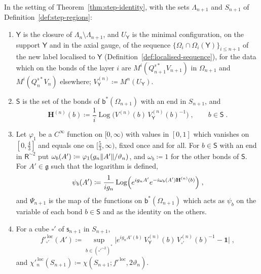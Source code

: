 \documentclass[11pt]{preprint}
\newcommand{\id}{\mathbf 1}
\DeclarePairedDelimiter{\norm}{\lVert}{\rVert}
\numberwithin{equation}{section}
\begin{document}
\begin{definition}\label{def:boundary-field}
In the setting of Theorem~\ref{thm:step-identity}, with the sets $\Lambda_{n+1}$ and $S_{n+1}$ of Definition~\ref{def:step-regions}:
\begin{enumerate}[label=(\roman*)]
\item $\mathsf Y$ is the closure of $\Lambda_n \setminus \Lambda_{n+1}$, and $U_{\mathsf Y}$ is the minimal configuration, on the support $\mathsf Y$ and in the axial gauge, of the sequence $\{ \Omega_i \cap \Omega_i(\mathsf Y) \}_{i \leqslant n+1}$ of the new label localised to $\mathsf Y$ (Definition~\ref{def:localised-sequence}), for the data which on the bonds of the layer $i$ are $M^i(Q^{s*}_{n+1}V_{n+1})$ in $\Omega_{n+1}$ and $M^i(Q^{s*}_nV_n)$ elsewhere; $V^{(n)}_{\mathsf Y} \coloneqq M^n(U_{\mathsf Y})$.
\item $\mathsf S$ is the set of the bonds of $\mathsf b^*(\Omega_{n+1})$ with an end in $S_{n+1}$, and
\begin{equation}\label{eq:boundary-field}
    \mathbf H^{(n)}(b) \coloneqq \frac{1}{i}\operatorname{Log}\bigl(V^{(n)}(b)\,V^{(n)}_{\mathsf Y}(b)^{-1}\bigr)\;,
    \qquad
    b \in \mathsf S\;.
\end{equation}
\item Let $\varphi_1$ be a $C^\infty$ function on $[0, \infty)$ with values in $[0, 1]$ which vanishes on $[0, \frac{4}{3}]$ and equals one on $[\frac{5}{3}, \infty)$, fixed once and for all. For $b \in \mathsf S$ with an end in $\mathsf R^{\sim2}$ put $\omega_b(A') \coloneqq \varphi_1(g_n\norm{A'}/\vartheta_n)$, and $\omega_b \coloneqq 1$ for the other bonds of $\mathsf S$. For $A' \in \mathfrak g$ such that the logarithm is defined,
\begin{equation}\label{eq:boundary-change}
    \psi_b(A') \coloneqq \frac{1}{ig_n}\operatorname{Log}\Bigl(e^{ig_nA'}e^{-i\omega_b(A')\mathbf H^{(n)}(b)}\Bigr)\;,
\end{equation}
and $\Psi_{n+1}$ is the map of the functions on $\mathsf b^*(\Omega_{n+1})$ which acts as $\psi_b$ on the variable of each bond $b \in \mathsf S$ and as the identity on the others.
\item For a cube $\square'$ of $\mathsf s_{n+1}$ in $S_{n+1}$,
\begin{equation}\label{eq:local-deviation-test}
    f'^{\,\mathrm{loc}}_{\square'}(A') \coloneqq \sup_{b \in (\square'^{\sim2})^*}\bigl\lvert e^{ig_nA'(b)}\,V^{(n)}_{\mathsf Y}(b)\,V^{(n)}_{\square'}(b)^{-1} - \id\bigr\rvert\;,
\end{equation}
and $\chi'^{\,\mathrm{loc}}_n(S_{n+1}) \coloneqq \chi(S_{n+1}; f'^{\,\mathrm{loc}}, 2\vartheta_n)$.
\end{enumerate}
\end{definition}
\end{document}
